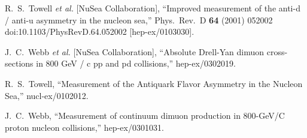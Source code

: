 \documentclass[11pt]{article}
\begin{document}
\begin{thebibliography}{9}
  R.~S.~Towell {\it et al.} [NuSea Collaboration],
  ``Improved measurement of the anti-d / anti-u asymmetry in the nucleon sea,''
  Phys.\ Rev.\ D {\bf 64} (2001) 052002
  doi:10.1103/PhysRevD.64.052002
  [hep-ex/0103030].

  J.~C.~Webb {\it et al.} [NuSea Collaboration],
  ``Absolute Drell-Yan dimuon cross-sections in 800 GeV / c pp and pd collisions,''
  hep-ex/0302019.

  R.~S.~Towell,
  ``Measurement of the Antiquark Flavor Asymmetry in the Nucleon Sea,''
  nucl-ex/0102012.

  J.~C.~Webb,
  ``Measurement of continuum dimuon production in 800-GeV/C proton nucleon collisions,''
  hep-ex/0301031.


\end{thebibliography}
\end{document}
